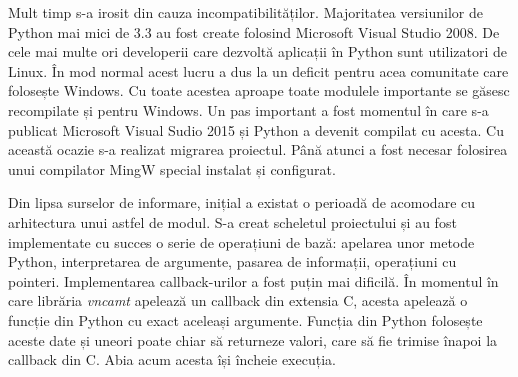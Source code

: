 Mult timp s-a irosit din cauza incompatibilităților. Majoritatea versiunilor de Python mai mici de 3.3 au fost create folosind Microsoft Visual Studio 2008. De cele mai multe ori developerii care dezvoltă aplicații în Python sunt utilizatori de Linux. În mod normal acest lucru a dus la un deficit pentru acea comunitate care folosește Windows. Cu toate acestea aproape toate modulele importante se găsesc recompilate și pentru Windows. Un pas important a fost momentul în care s-a publicat Microsoft Visual Sudio 2015 și Python a devenit compilat cu acesta. Cu această ocazie s-a realizat migrarea proiectul. Până atunci a fost necesar folosirea unui compilator MingW special instalat și configurat.

Din lipsa surselor de informare, inițial a existat o perioadă de acomodare cu arhitectura unui astfel de modul. S-a creat scheletul proiectului și au fost implementate cu succes o serie de operațiuni de bază: apelarea unor metode Python, interpretarea de argumente, pasarea de informații, operațiuni cu pointeri. Implementarea callback-urilor a fost puțin mai dificilă. În momentul în care librăria \textit{vncamt} apelează un callback din extensia C, acesta apelează o funcție din Python cu exact aceleași argumente. Funcția din Python folosește aceste date și uneori poate chiar să returneze valori, care să fie trimise înapoi la callback din C. Abia acum acesta își încheie execuția.

%
%





